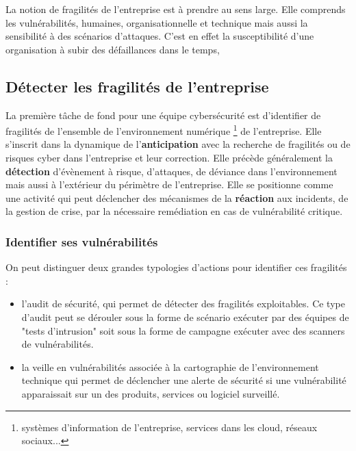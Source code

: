 


La notion de  fragilités de l'entreprise est à prendre au sens large. Elle comprends les vulnérabilités, humaines, organisationnelle et technique mais aussi la sensibilité à des scénarios d'attaques. C'est en effet  la susceptibilité d’une organisation à subir des défaillances dans le temps, 

\subsection{Détecter les fragilités de l’entreprise}

La première tâche de fond pour une équipe cybersécurité est  d'identifier de fragilités de l'ensemble de l'environnement numérique \footnote{systèmes d'information de l'entreprise, services dans les cloud, réseaux sociaux...} de l'entreprise. Elle s'inscrit dans la dynamique de  l'\textbf{anticipation} avec la recherche de fragilités ou de risques cyber dans l'entreprise et leur correction. Elle précède généralement la \textbf{détection} d'évènement à risque, d'attaques, de déviance dans l'environnement mais aussi à l'extérieur du périmètre de l'entreprise.
Elle se positionne comme une activité  qui peut déclencher des mécanismes de la  \textbf{réaction} aux incidents, de la gestion de crise, par la nécessaire remédiation en cas de vulnérabilité critique.

\begin{frame}
\frametitle<presentation>{Identifier ses vulnérabilités}
On peut distinguer deux grandes typologies d'actions pour identifier ces fragilités :
\begin{itemize}
	\item  l'audit  de sécurité, qui permet de détecter des fragilités exploitables. Ce type d'audit peut se dérouler sous la forme de scénario exécuter par des équipes de "tests d'intrusion" soit sous la forme de campagne exécuter avec des scanners de vulnérabilités.
	\item la veille en vulnérabilités associée à la cartographie de l'environnement technique qui permet de déclencher une alerte de sécurité si une vulnérabilité apparaissait sur un des produits, services ou logiciel surveillé.
\end{itemize}
\end{frame}

